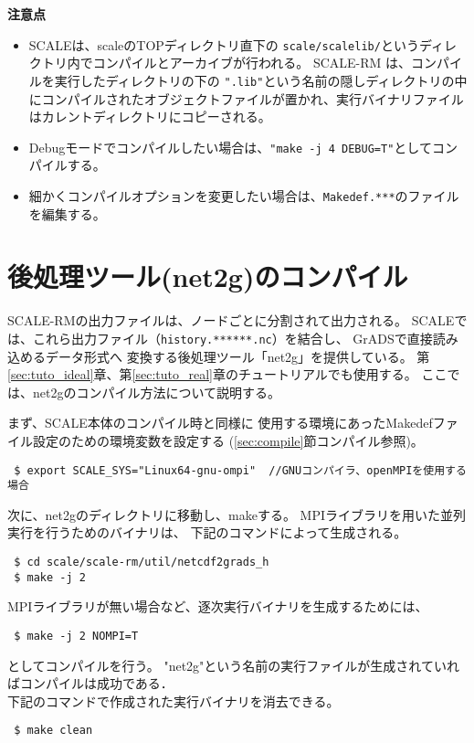 {\bf 注意点}
\begin{itemize}
\item SCALEは、scaleのTOPディレクトリ直下の
 \verb|scale/scalelib/|というディレクトリ内でコンパイルとアーカイブが行われる。
 SCALE-RM は、コンパイルを実行したディレクトリの下の
 \verb|".lib"|という名前の隠しディレクトリの中にコンパイルされたオブジェクトファイルが置かれ、実行バイナリファイルはカレントディレクトリにコピーされる。
\item Debugモードでコンパイルしたい場合は、\verb|"make -j 4 DEBUG=T"|としてコンパイルする。
\item 細かくコンパイルオプションを変更したい場合は、\verb|Makedef.***|のファイルを編集する。
\end{itemize}



\section{後処理ツール(net2g)のコンパイル} \label{sec:source_net2g}

SCALE-RMの出力ファイルは、ノードごとに分割されて出力される。
SCALEでは、これら出力ファイル（\verb|history.******.nc|）を結合し、
GrADSで直接読み込めるデータ形式へ
変換する後処理ツール「net2g」を提供している。
第\ref{sec:tuto_ideal}章、第\ref{sec:tuto_real}章のチュートリアルでも使用する。
ここでは、net2gのコンパイル方法について説明する。



まず、SCALE本体のコンパイル時と同様に
使用する環境にあったMakedefファイル設定のための環境変数を設定する
(\ref{sec:compile}節コンパイル参照)。
\begin{verbatim}
 $ export SCALE_SYS="Linux64-gnu-ompi"  //GNUコンパイラ、openMPIを使用する場合
\end{verbatim}

次に、net2gのディレクトリに移動し、makeする。
MPIライブラリを用いた並列実行を行うためのバイナリは、
下記のコマンドによって生成される。
\begin{verbatim}
 $ cd scale/scale-rm/util/netcdf2grads_h
 $ make -j 2
\end{verbatim}
MPIライブラリが無い場合など、逐次実行バイナリを生成するためには、\\
\begin{verbatim}
 $ make -j 2 NOMPI=T
\end{verbatim}
としてコンパイルを行う。
"net2g"という名前の実行ファイルが生成されていればコンパイルは成功である．\\

下記のコマンドで作成された実行バイナリを消去できる。
\begin{verbatim}
 $ make clean
\end{verbatim}


